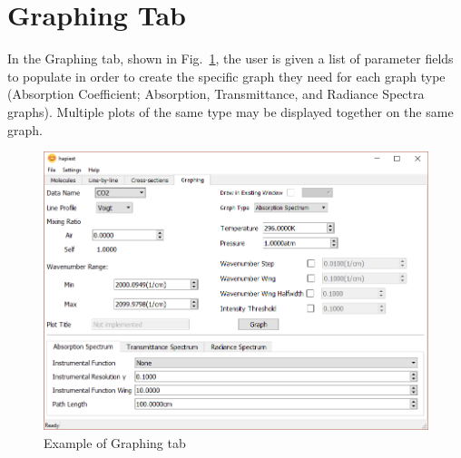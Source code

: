 \documentclass[12pt]{article}
\begin{document}
\section{Graphing Tab}
In the Graphing tab, shown in Fig.~\ref{fig:graphing}, the user is given a list of parameter fields to populate in order to create the specific graph they need for each graph type (Absorption Coefficient; Absorption, Transmittance, and Radiance Spectra graphs). Multiple plots of the same type may be displayed together on the same graph.
\begin{figure}[h]
\centering
\includegraphics[scale = 0.6]{hapiest_graphing.png}
\caption{Example of Graphing tab}
\label{fig:graphing}
\end{figure}

\end{document}
